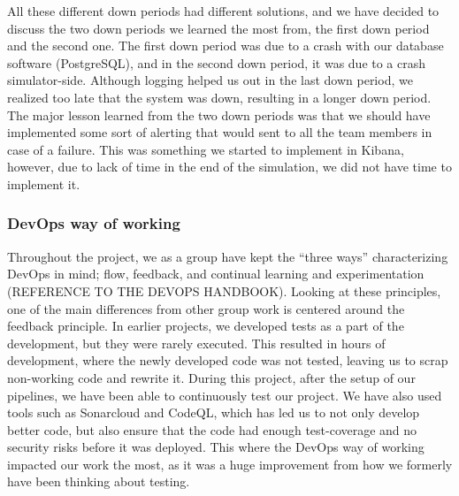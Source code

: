 All these different down periods had different solutions, and we have decided to discuss the two down periods we learned the most from, the first down period and the second one. The first down period was due to a crash with our database software (PostgreSQL), and in the second down period, it was due to a crash simulator-side. Although logging helped us out in the last down period, we realized too late that the system was down, resulting in a longer down period. The major lesson learned from the two down periods was that we should have implemented some sort of alerting that would sent to all the team members in case of a failure. This was something we started to implement in Kibana, however, due to lack of time in the end of the simulation, we did not have time to implement it.

\subsubsection{DevOps way of working}

Throughout the project, we as a group have kept the “three ways” characterizing DevOps in mind; flow, feedback, and continual learning and experimentation (REFERENCE TO THE DEVOPS HANDBOOK). Looking at these principles, one of the main differences from other group work is centered around the feedback principle. In earlier projects, we developed tests as a part of the development, but they were rarely executed. This resulted in hours of development, where the newly developed code was not tested, leaving us to scrap non-working code and rewrite it. During this project, after the setup of our pipelines, we have been able to continuously test our project. We have also used tools such as Sonarcloud and CodeQL, which has led us to not only develop better code, but also ensure that the code had enough test-coverage and no security risks before it was deployed. This where the DevOps way of working impacted our work the most, as it was a huge improvement from how we formerly have been thinking about testing.